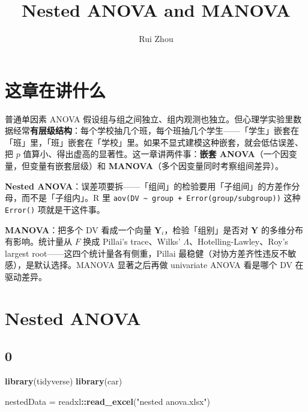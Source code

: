 \documentclass[
]{ctexart}
\title{Nested ANOVA and MANOVA}
\author{Rui Zhou}
\date{}
\newenvironment{Shaded}{\begin{snugshade}}{\end{snugshade}}
\newcommand{\FunctionTok}[1]{\textcolor[rgb]{0.13,0.29,0.53}{\textbf{#1}}}
\newcommand{\NormalTok}[1]{#1}
\newcommand{\OtherTok}[1]{\textcolor[rgb]{0.56,0.35,0.01}{#1}}
\newcommand{\SpecialCharTok}[1]{\textcolor[rgb]{0.81,0.36,0.00}{\textbf{#1}}}
\newcommand{\StringTok}[1]{\textcolor[rgb]{0.31,0.60,0.02}{#1}}
\begin{document}
\maketitle

{
\setcounter{tocdepth}{2}
\tableofcontents
}
\hypertarget{ux8fd9ux7ae0ux5728ux8bb2ux4ec0ux4e48}{%
\section{这章在讲什么}\label{ux8fd9ux7ae0ux5728ux8bb2ux4ec0ux4e48}}

普通单因素 ANOVA
假设组与组之间独立、组内观测也独立。但心理学实验里数据经常\textbf{有层级结构}：每个学校抽几个班，每个班抽几个学生------「学生」嵌套在「班」里，「班」嵌套在「学校」里。如果不显式建模这种嵌套，就会低估误差、把
\(p\) 值算小、得出虚高的显著性。这一章讲两件事：\textbf{嵌套
ANOVA}（一个因变量，但变量有嵌套层级）和
\textbf{MANOVA}（多个因变量同时考察组间差异）。

\begin{concept}[两个核心区别]
\textbf{Nested ANOVA}：误差项要拆——「组间」的检验要用「子组间」的方差作分母，而不是「子组内」。R 里 \texttt{aov(DV \~{} group + Error(group/subgroup))} 这种 \texttt{Error()} 项就是干这件事。

\textbf{MANOVA}：把多个 DV 看成一个向量 $\mathbf{Y}_i$，检验「组别」是否对 $\mathbf{Y}$ 的多维分布有影响。统计量从 $F$ 换成 Pillai's trace、Wilks' $\Lambda$、Hotelling-Lawley、Roy's largest root——这四个统计量各有侧重，Pillai 最稳健（对协方差齐性违反不敏感），是默认选择。MANOVA 显著之后再做 univariate ANOVA 看是哪个 DV 在驱动差异。
\end{concept}

\hypertarget{nested-anova}{%
\section{Nested ANOVA}\label{nested-anova}}

\hypertarget{section}{%
\subsection{0}\label{section}}

\begin{Shaded}
\begin{Highlighting}[]
\FunctionTok{library}\NormalTok{(tidyverse)}
\FunctionTok{library}\NormalTok{(car)}

\NormalTok{nestedData }\OtherTok{=}\NormalTok{ readxl}\SpecialCharTok{::}\FunctionTok{read\_excel}\NormalTok{(}\StringTok{"nested anova.xlsx"}\NormalTok{)}
\end{Highlighting}
\end{Shaded}
\end{document}

